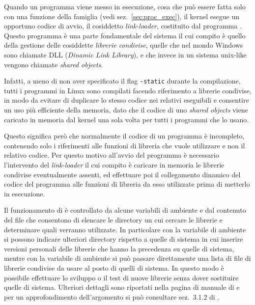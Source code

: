 Quando un programma viene messo in esecuzione, cosa che può essere fatta solo
con una funzione della famiglia  (vedi sez.~\ref{sec:proc_exec}),
il kernel esegue un opportuno codice di avvio, il cosiddetto
\textit{link-loader}, costituito dal programma . Questo
programma è una parte fondamentale del sistema il cui compito è quello della
gestione delle cosiddette \textsl{librerie condivise}, quelle che nel mondo
Windows sono chiamate DLL (\textit{Dinamic Link Library}), e che invece in un
sistema unix-like vengono chiamate \textit{shared objects}.

Infatti, a meno di non aver specificato il flag \texttt{-static} durante la
compilazione, tutti i programmi in Linux sono compilati facendo riferimento a
librerie condivise, in modo da evitare di duplicare lo stesso codice nei
relativi eseguibili e consentire un uso più efficiente della memoria, dato che
il codice di uno \textit{shared objects} viene caricato in memoria dal kernel
una sola volta per tutti i programmi che lo usano.

Questo significa però che normalmente il codice di un programma è incompleto,
contenendo solo i riferimenti alle funzioni di libreria che vuole utilizzare e
non il relativo codice. Per questo motivo all'avvio del programma è necessario
l'intervento del \textit{link-loader} il cui compito è caricare in memoria le
librerie condivise eventualmente assenti, ed effettuare poi il collegamento
dinamico del codice del programma alle funzioni di libreria da esso utilizzate
prima di metterlo in esecuzione.

Il funzionamento di  è controllato da alcune variabili di
ambiente e dal contenuto del file  che consentono di
elencare le directory un cui cercare le librerie e determinare quali verranno
utilizzate.  In particolare con la variabile di ambiente
 si possono indicare ulteriori directory rispetto a
quelle di sistema in cui inserire versioni personali delle librerie che hanno
la precedenza su quelle di sistema, mentre con la variabile di ambiente
 si può passare direttamente una lista di file di librerie
condivise da usare al posto di quelli di sistema. In questo modo è possibile
effettuare lo sviluppo o il test di nuove librerie senza dover sostituire
quelle di sistema. Ulteriori dettagli sono riportati nella pagina di manuale
di  e per un approfondimento dell'argomento si può consultare
sez.~3.1.2 di \cite{AGL}.

